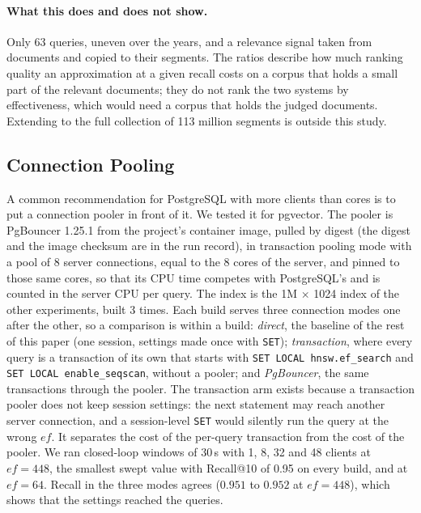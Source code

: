 \documentclass[preprint,12pt]{elsarticle}
\begin{document}
\paragraph{What this does and does not show.} Only 63 queries, uneven over the years, and a relevance
signal taken from documents and copied to their segments. The ratios describe how much ranking quality an approximation
at a given recall costs on a corpus that holds a small part of the relevant documents; they do not rank the two systems by
effectiveness, which would need a corpus that holds the judged documents. Extending to the full collection of 113 million
segments is outside this study.


\subsection{Connection Pooling}
\label{sec:pooling}

A common recommendation for PostgreSQL with more clients than cores is to put a connection pooler in front of it. We tested
it for pgvector. The pooler is PgBouncer 1.25.1 from the project's container image, pulled by digest (the digest and the
image checksum are in the run record), in transaction pooling mode with a pool of 8 server connections, equal to the 8 cores of the server, and
pinned to those same cores, so that its CPU time competes with PostgreSQL's and is counted in the server CPU per query. The
index is the 1M $\times$ 1024 index of the other experiments, built 3 times. Each build serves three connection modes one
after the other, so a comparison is within a build: \emph{direct}, the baseline of the rest of this paper (one session, settings
made once with \texttt{SET}); \emph{transaction}, where every query is a transaction of its own that starts with
\texttt{SET LOCAL hnsw.ef\_search} and \texttt{SET LOCAL enable\_seqscan}, without a pooler; and \emph{PgBouncer}, the same
transactions through the pooler. The transaction arm exists because a transaction pooler does not keep session settings: the
next statement may reach another server connection, and a session-level \texttt{SET} would silently run the query at the wrong
$ef$. It separates the cost of the per-query transaction from the cost of the pooler. We ran closed-loop windows of 30\,s with 1,
8, 32 and 48 clients at $ef=448$, the smallest swept value with Recall@10 of 0.95 on every build, and at $ef=64$. Recall
in the three modes agrees ($0.951$ to $0.952$ at $ef=448$), which shows that the settings reached the queries.
\end{document}

